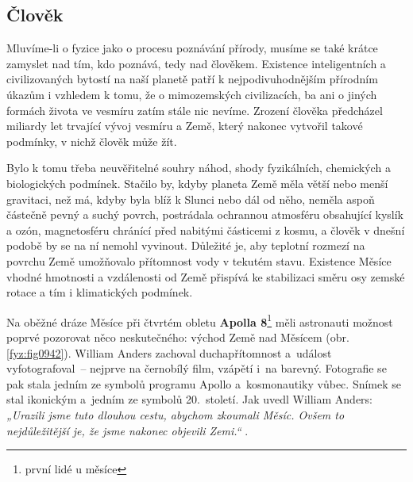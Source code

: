     \subsection{Člověk}
      Mluvíme-li o fyzice jako o procesu poznávání přírody, musíme se také krátce zamyslet nad tím,
      kdo poznává, tedy nad člověkem. Existence inteligentních a civilizovaných bytostí na naší
      planetě patří k nejpodivuhodnějším přírodním úkazům i vzhledem k tomu, že o mimozemských
      civilizacích, ba ani o jiných formách života ve vesmíru zatím stále nic nevíme. Zrození
      člověka předcházel miliardy let trvající vývoj vesmíru a Země, který nakonec vytvořil takové
      podmínky, v nichž člověk může žít.

      Bylo k tomu třeba neuvěřitelné souhry náhod, shody fyzikálních, chemických a biologických
      podmínek. Stačilo by, kdyby planeta Země měla větší nebo menší gravitaci, než má, kdyby byla
      blíž k Slunci nebo dál od něho, neměla aspoň částečně pevný a suchý povrch, postrádala
      ochrannou atmosféru obsahující kyslík a ozón, magnetosféru chránící před nabitými částicemi z
      kosmu, a člověk v dnešní podobě by se na ní nemohl vyvinout. Důležité je, aby teplotní rozmezí
      na povrchu Země umožňovalo přítomnost vody v tekutém stavu. Existence Měsíce vhodné hmotnosti
      a vzdálenosti od Země přispívá ke stabilizaci směru osy zemské rotace a tím i klimatických
      podmínek.


      Na oběžné dráze Měsíce při čtvrtém obletu \textbf{Apolla 8}\footnote{první lidé u měsíce} měli
      astronauti možnost poprvé pozorovat něco neskutečného: východ Země nad Měsícem (obr.
      \ref{fyz:fig0942}). William Anders zachoval duchapřítomnost a událost vyfotografoval – nejprve
      na černobílý film, vzápětí i na barevný. Fotografie se pak stala jedním ze symbolů programu
      Apollo a kosmonautiky vůbec. Snímek se stal ikonickým a jedním ze symbolů 20. století. Jak
      uvedl William Anders: \emph{„Urazili jsme tuto dlouhou cestu, abychom zkoumali Měsíc. Ovšem to
      nejdůležitější je, že jsme nakonec objevili Zemi.“} \cite[s.~69]{Prikryl2019}.

